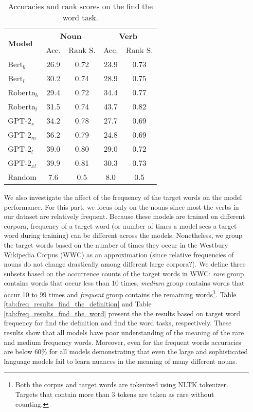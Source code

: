 \documentclass[11pt,a4paper]{article}
\begin{document}
\begin{table}
    \centering
    \begin{tabular}{l|cccc}
        \hline
         \multirow{2}{*}{\textbf{Model}} & \multicolumn{2}{c}{\textbf{Noun}} & \multicolumn{2}{c}{\textbf{Verb}} \\
         & Acc. & Rank S. & Acc. & Rank S. \\ \hline
     Bert$_{b}$ & 26.9 & 0.72 & 23.9 & 0.73 \\
     Bert$_{l}$ & 30.2 & 0.74 & 28.9 & 0.75 \\
     Roberta$_{b}$ & 29.4 & 0.72 & 34.4 & 0.77 \\
     Roberta$_{l}$ & 31.5 & 0.74 & 43.7 & 0.82 \\ \hline
     GPT-2$_{s}$ & 34.2 & 0.78 & 27.7 & 0.69 \\
     GPT-2$_{m}$ & 36.2 & 0.79 & 24.8 & 0.69 \\
     GPT-2$_{l}$ & 39.0 & 0.80 & 29.0 & 0.72 \\
     GPT-2$_{xl}$ & 39.9 & 0.81 & 30.3 & 0.73 \\ \hline 
     Random & 7.6 & 0.5 & 8.0 & 0.5 \\\hline
     
    \end{tabular}
    \caption{Accuracies and rank scores on the find the word task.}
    \label{tab:results_find_the_word}
\end{table}


We also investigate the affect of the frequency of the target words on the model performance. For this part, we focus only on the nouns since most the verbs in our dataset are relatively frequent. Because these models are trained on different corpora, frequency of a target word (or number of times a model sees a target word during training) can be different across the models. Nonetheless, we group the target words based on the number of times they occur in the Westbury Wikipedia Corpus (WWC) \cite{WWC} as an approximation (since relative frequencies of nouns do not change drastically among different large corpora?). We define three subsets based on the occurrence counts of the target words in WWC: \textit{rare} group contains words that occur less than 10 times, \textit{medium} group contains words that occur 10 to 99 times and \textit{frequent} group contains the remaining words\footnote{Both the corpus and target words are tokenized using NLTK tokenizer.  Targets that contain more than 3 tokens are taken as rare without counting.}. Table \ref{tab:freq_results_find_the_definition} and Table \ref{tab:freq_results_find_the_word} present the the results based on target word frequency for find the definition and find the word tasks, respectively. These results show that all models have poor understanding of the meaning of the rare and medium frequency words. Moreover, even for the frequent words accuracies are below 60\% for all models demonstrating that even the large and sophisticated language models fail to learn nuances in the meaning of many different nouns. 
\end{document}
